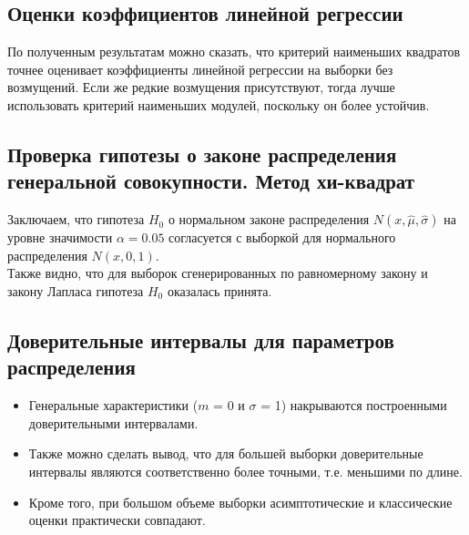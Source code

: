 \documentclass[a4paper]{article}
\begin{document}
\subsection{Оценки коэффициентов линейной регрессии}
\noindent По полученным результатам можно сказать, что критерий наименьших квадратов точнее оценивает коэффициенты линейной регрессии на выборки без возмущений. Если же редкие возмущения присутствуют, тогда лучше использовать критерий наименьших модулей, поскольку он более устойчив.
\subsection{Проверка гипотезы о законе распределения генеральной совокупности. Метод хи-квадрат}
	
\noindent Заключаем, что гипотеза $H_{0}$ о нормальном законе распределения $N(x,\hat{\mu}, \hat{\sigma})$ на уровне значимости $\alpha = 0.05$ согласуется с выборкой для нормального распределения $N(x, 0, 1)$.
\\
Также видно, что для выборок сгенерированных по равномерному закону и закону Лапласа гипотеза $H_{0}$ оказалась принята.
 \subsection{Доверительные интервалы для параметров распределения}
 \begin{itemize}
    \item Генеральные характеристики ($m$ = 0 и $\sigma$ = 1) накрываются построенными доверительными интервалами. 
    \item Также можно сделать вывод, что для большей выборки доверительные интервалы являются соответственно более точными, т.е. меньшими по длине. 
    \item Кроме того, при большом объеме выборки асимптотические и классические оценки практически совпадают.
\end{itemize}
\end{document}
